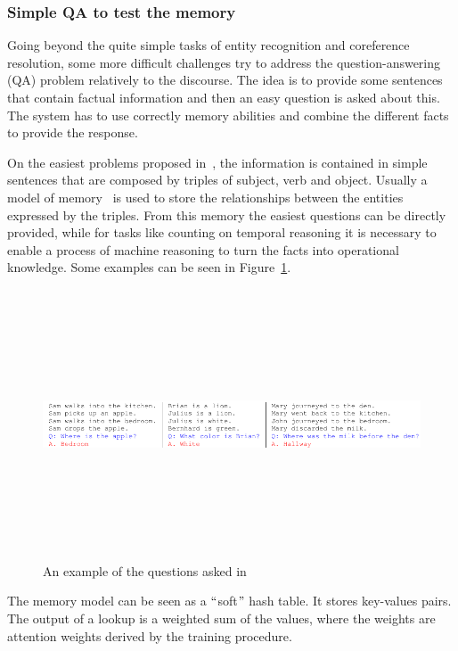 \subsubsection{Simple QA to test the memory}
Going beyond the quite simple tasks of entity recognition and coreference resolution, some more difficult challenges try to address the question-answering (QA) problem relatively to the discourse. The idea is to provide some sentences that contain factual information and then an easy question is asked about this. The system has to use correctly memory abilities and combine the different facts to provide the response.

On the easiest problems proposed in~\cite{weston2015towards}, the information is contained in simple sentences that are composed by triples of subject, verb and object. Usually a model of memory~\cite{sukhbaatar2015end} is used to store the relationships between the entities expressed by the triples. From this memory the easiest questions can be directly provided, while for tasks like counting on temporal reasoning it is necessary to enable a process of machine reasoning to turn the facts into operational knowledge. Some examples can be seen in Figure~\ref{fig:toyQuestionsMemory}.


\begin{figure}[!htbp]
    \centering
    \includegraphics[max width=\linewidth,max height=8cm,keepaspectratio]{figures/toyQuestionsMemory}
    \caption{An example of the questions asked in~\cite{weston2015towards}}\label{fig:toyQuestionsMemory}
\end{figure}

The memory model can be seen as a $``$soft$"$  hash table. It stores key-values pairs. The output of a lookup is a weighted sum of the values, where the weights are attention weights derived by the training procedure.

